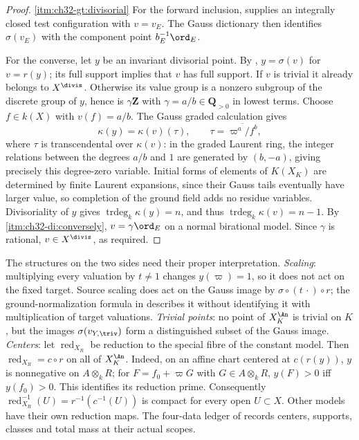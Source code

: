 \begin{proof}
\cref{itm:ch32-gt:divisorial}  For the forward inclusion,
 supplies an integrally closed test
configuration with $v=v_E$.  The Gauss dictionary then identifies
$\sigma(v_E)$ with the component point $b_E^{-1}\ord_E$.

For the converse, let $y$ be an invariant divisorial point.  By
, $y=\sigma(v)$ for $v=r(y)$; its full support
implies that $v$ has full support.  If $v$ is trivial it already belongs
to $X^{\divis}$.  Otherwise its value group is a nonzero subgroup of
the discrete group of $y$, hence is $\gamma\mathbf Z$ with
$\gamma=a/b\in\mathbf Q_{>0}$ in lowest terms.  Choose $f\in k(X)$
with $v(f)=a/b$.  The Gauss graded calculation gives
\[
 \kappa(y)=\kappa(v)(\tau),\qquad
 \tau=\overline{\varpi^a/f^b},
\]
where $\tau$ is transcendental over $\kappa(v)$: in the graded Laurent
ring, the integer relations between the degrees $a/b$ and $1$ are
generated by $(b,-a)$, giving precisely this degree-zero variable.
Initial forms of elements of $K(X_K)$ are determined by finite Laurent
expansions, since their Gauss tails eventually have larger value, so
completion of the ground field adds no residue variables.  Divisoriality
of $y$ gives $\operatorname{trdeg}_k\kappa(y)=n$, and thus
$\operatorname{trdeg}_k\kappa(v)=n-1$.  By
\,\cref{itm:ch32-di:conversely},
$v=\gamma\ord_E$ on a normal birational model.  Since $\gamma$ is
rational, $v\in X^{\divis}$, as required.
\end{proof}

\begin{remark}
\label{rem:ch32-gauss-not-transfer}
The structures on the two sides need their proper interpretation.
\emph{Scaling}: multiplying every valuation by $t\neq1$ changes
$y(\varpi)=1$, so it does not act on the fixed target.  Source scaling
does act on the Gauss image by $\sigma\circ(t\,\cdot)\circ r$; the
ground-normalization formula in  describes
it without identifying it with multiplication of target valuations.
\emph{Trivial points}: no point of $X_K^{\An}$ is trivial on $K$, but
the images $\sigma(v_{Y,\triv})$ form a distinguished subset of the
Gauss image.
\emph{Centers}: let $\operatorname{red}_{X_R}$ be reduction to the
special fibre of the constant model.  Then
$\operatorname{red}_{X_R}=c\circ r$ on all of $X_K^{\An}$.
Indeed, on an affine chart centered at $c(r(y))$, $y$ is nonnegative on
$A\otimes_kR$; for $F=f_0+\varpi G$ with $G\in A\otimes_kR$,
$y(F)>0$ iff $y(f_0)>0$.  This identifies its reduction prime.
Consequently
$\operatorname{red}_{X_R}^{-1}(U)=r^{-1}(c^{-1}(U))$ is compact for
every open $U\subset X$.  Other models have their own reduction maps.
The four-data ledger of  records centers,
supports, classes and total mass at their actual scopes.
\end{remark}

